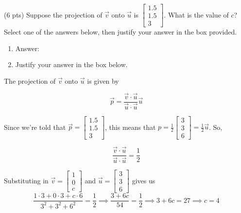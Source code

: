 \documentclass[11pt]{article}
\begin{document}
\begin{prob}
\vspace{0.2in}

\begin{subprob}(6 pts) Suppose the projection of $\vec v$ onto $\vec u$ is $\begin{bmatrix} 1.5 \\ 1.5 \\ 3 \end{bmatrix}$. What is the value of $c$? Select one of the answers below, then justify your answer in the box provided.

\begin{enumerate}
    \item Answer: \:       
    \item Justify your answer in the box below. \\  \emptybox{7.5cm}{}
\end{enumerate}

\begin{solution}
The projection of $\vec v$ onto $\vec u$ is given by

$$\vec p = \frac{\vec v \cdot \vec u}{\vec u \cdot \vec u} \vec u$$

Since we're told that $\vec p = \begin{bmatrix} 1.5 \\ 1.5 \\ 3 \end{bmatrix}$, this means that $p = \frac{1}{2} \begin{bmatrix} 3 \\ 3 \\ 6 \end{bmatrix} = \frac{1}{2} \vec u$. So,

$$\frac{\vec v \cdot \vec u}{\vec u \cdot \vec u} = \frac{1}{2}$$

Substituting in $\vec v = \begin{bmatrix} 1 \\ 0 \\ c \end{bmatrix}$ and $\vec u = \begin{bmatrix} 3 \\ 3 \\ 6 \end{bmatrix}$ gives us \\

$$\frac{1 \cdot 3 + 0 \cdot 3 + c \cdot 6}{3^2 + 3^2 + 6^2} = \frac{1}{2} \implies \frac{3 + 6c}{54} = \frac{1}{2} \implies 3 + 6c = 27 \implies \boxed{c = 4}$$


\end{solution}
\end{subprob}
\end{prob}
\end{document}
